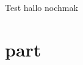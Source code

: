 \documentclass{article}
\begin{document}
	Test hallo
	nochmak

	\part{part} %
	\label{prt:part_}
	
\end{document}
